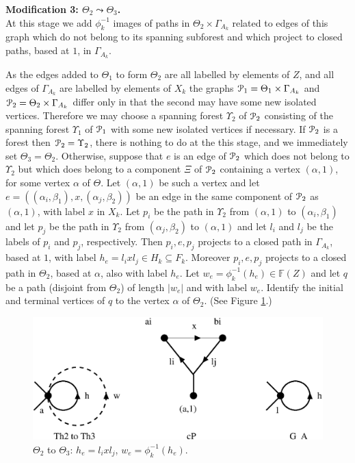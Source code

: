 \documentclass[a4paper,12pt]{article}
\renewcommand{\a}{\alpha }
\renewcommand{\b}{\beta }
\newcommand{\G}{\Gamma }
\newcommand{\T}{\Theta }
\newcommand{\U}{\Upsilon }
\newcommand{\cP}{{\cal{P}}}
\numberwithin{equation}{section}
\numberwithin{figure}{section}
\newcommand{\FF}{\ensuremath{\mathbb{F}}}
\begin{document}
\noindent\textbf{Modification 3: $\T_2\leadsto \T_3$.}\\
At this stage we add $\phi_k^{-1}$ images of paths in $\T_2\times
\G_{A_k}$ related to edges of this graph which do not belong to
its spanning subforest and which project to closed paths,
based at $1$, in $\G_{A_k}$.

As the edges added to $\T_1$ to form $\T_2$ are all labelled by elements
of $Z$, and all edges of $\G_{A_k}$ are labelled by elements of $X_k$
the graphs $\cP_1=\T_1\times \G_{A_k}$ and $\cP_2=\T_2\times \G_{A_k}$ differ only
in that the second may have some new isolated vertices. Therefore we may
choose a spanning forest $\U_2$ of $\cP_2$ consisting of the spanning
forest $\U_1$ of $\cP_1$ with some new isolated vertices if necessary.
If $\cP_2$ is a forest then
$\cP_2=\U_2$, there is nothing to do at the
this stage, and we immediately set $\T_3=\T_2$. Otherwise, suppose
that $e$ is an edge of $\cP_2$ which does not belong to $\U_2$ but
which does belong to a component $\Xi$  of $\cP_2$ containing a
vertex $(\a,1)$, for some vertex $\a$ of $\T$. Let $(\a,1)$ be
such a vertex and let $e=((\a_i,\b_1), x, (\a_j,\b_2))$ be an edge
in the same component of $\cP_2$ as $(\a,1)$,
 with label $x$ in $X_k$.
 Let $p_i$ be
the path in $\U_2$ from $(\a,1)$ to $(\a_i,\b_1)$ and let $p_j$ be
the path in $\U_2 $ from  $(\a_j,\b_2)$ to $(\a,1)$ and let $l_i$
and $l_j$ be the labels of $p_i$ and $p_j$, respectively. Then
$p_i,e,p_j$ projects to a closed path in $\G_{A_k}$, based at $1$,
with label $h_e=l_i x l_j \in H_k\subseteq F_k$. Moreover
$p_i,e,p_j$ projects to a closed path in $\T_2$, based at $\a$,
also with label $h_e$. Let $w_e=\phi_k^{-1}(h_e) \in \FF(Z)$ and let
$q$ be a path (disjoint from $\T_2$) of length $|w_e|$ and with
label $w_e$. Identify the initial and terminal vertices of $q$ to
the vertex  $\a$ of $\Theta_2$. (See Figure \ref{fig:alg2-3}.)
\begin{figure}
\begin{center}
\psfrag{a}{$\a$} \psfrag{b}{$\b$} 
  
 \psfrag{ai}{$(\a_i,\b_1)$}
\psfrag{bi}{$(\a_j,\b_2)$} \psfrag{(a,1)}{$(\a,1)$}
 \psfrag{Th2 to Th3}{$\T_2\leadsto \T_3$}
\psfrag{cP}{$\cP_2$} \psfrag{G_A}{$\G_{A_k}$}
\includegraphics[scale=.5]{alg2-3.eps}
\end{center}
\caption{$\Theta_2$ to $\Theta_3$: $h_e=l_ixl_j$,
$w_e=\phi_k^{-1}(h_e)$.}\label{fig:alg2-3}
\end{figure}
\end{document}
